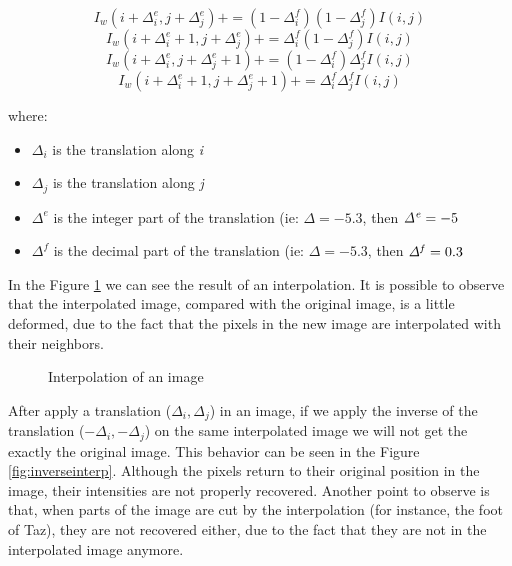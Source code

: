 \documentclass{article}
\begin{document}
	\begin{equation}
		I_w(i+\Delta_i^e , j+\Delta_j^e) += (1-\Delta_i^f)(1-\Delta_j^f)I(i,j)
	\end{equation}
	\begin{equation}
		I_w(i+\Delta_i^e+1 , j+\Delta_j^e) += \Delta_i^f(1-\Delta_j^f)I(i,j)
	\end{equation}
	\begin{equation}
  		I_w(i+\Delta_i^e , j+\Delta_j^e+1) += (1-\Delta_i^f)\Delta_j^fI(i,j)
	\end{equation}
	\begin{equation}
		I_w(i+\Delta_i^e+1 , j+\Delta_j^e+1) += \Delta_i^f \Delta_j^fI(i,j)
	\end{equation}

	where: 
		\begin{itemize}
			\item {\it $\Delta_i$} is the translation along {\it i}
			\item {\it $\Delta_j$} is the translation along {\it j} 
			\item {\it $\Delta^e$} is the integer part of the translation (ie: $\Delta=-5.3$, then ${\it \Delta^e}=-5$
			\item {\it $\Delta^f$} is the decimal part of the translation (ie: $\Delta=-5.3$, then ${\it \Delta^f}=0.3$
		\end{itemize}

	In the Figure \ref{fig:interp} we can see the result of an interpolation. It is possible to observe that the interpolated image, compared with the original image, is a little deformed, due to the fact that the pixels in the new image are interpolated with their neighbors.


	\begin{figure}[H]
		  \centering
		  \hspace{0.1cm}
		  \caption{Interpolation of an image}
		  \hspace{0.1cm}
		  \label{fig:interp}
	\end{figure}		

	

	After apply a translation ($\Delta_i,\Delta_j$) in an image, if we apply the inverse of the translation ($-\Delta_i,-\Delta_j$) on the same interpolated image we will not get the exactly the original image. This behavior can be seen in the Figure \ref{fig:inverseinterp}. Although the pixels return to their original position in the image, their intensities are not properly recovered. Another point to observe is that, when parts of the image are cut by the interpolation (for instance, the foot of Taz), they are not recovered either, due to the fact that they are not in the interpolated image anymore.
\end{document}
